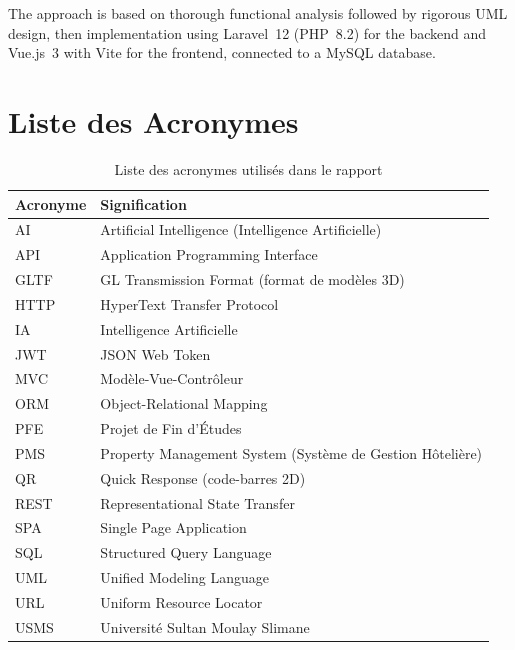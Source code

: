 \documentclass[12pt, a4paper]{report}
\begin{document}
The approach is based on thorough functional analysis followed by rigorous UML design,
then implementation using Laravel~12 (PHP~8.2) for the backend and Vue.js~3 with Vite
for the frontend, connected to a MySQL database.

\newpage

\chapter*{Liste des Acronymes}
\thispagestyle{plain}

\begin{table}[H]
  \centering
  \caption{Liste des acronymes utilisés dans le rapport}
  \begin{tabularx}{\textwidth}{lX}
    \toprule
    \textbf{Acronyme} & \textbf{Signification} \\
    \midrule
    AI    & Artificial Intelligence (Intelligence Artificielle) \\
    API   & Application Programming Interface \\
    GLTF  & GL Transmission Format (format de modèles 3D) \\
    HTTP  & HyperText Transfer Protocol \\
    IA    & Intelligence Artificielle \\
    JWT   & JSON Web Token \\
    MVC   & Modèle-Vue-Contrôleur \\
    ORM   & Object-Relational Mapping \\
    PFE   & Projet de Fin d'Études \\
    PMS   & Property Management System (Système de Gestion Hôtelière) \\
    QR    & Quick Response (code-barres 2D) \\
    REST  & Representational State Transfer \\
    SPA   & Single Page Application \\
    SQL   & Structured Query Language \\
    UML   & Unified Modeling Language \\
    URL   & Uniform Resource Locator \\
    USMS  & Université Sultan Moulay Slimane \\
    \bottomrule
  \end{tabularx}
\end{table}
\end{document}

